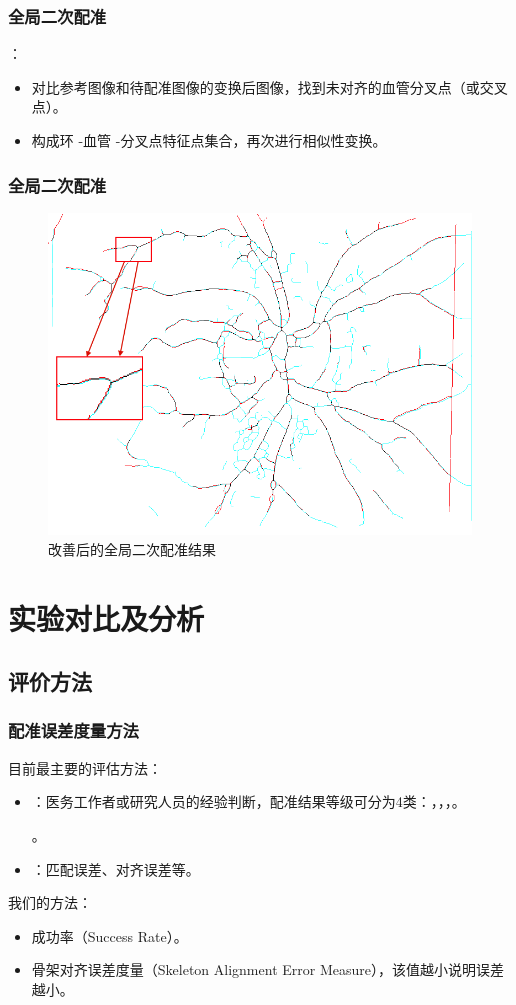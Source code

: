 \documentclass[notheorems,mathserif,table,compress]{beamer}  %
\begin{document}
 \begin{frame}
 \frametitle{全局二次配准}
 {\color{blue}{解决方法}}：
 \begin{itemize}
 \item 对比参考图像和待配准图像的变换后图像，找到未对齐的血管分叉点（或交叉点）。
 \item 构成环 -血管 -分叉点特征点集合，再次进行相似性变换。
 \end{itemize}
\end{frame}

 \begin{frame}
 \frametitle{全局二次配准}
  \begin{figure}[ht!]
    \centering
  \includegraphics[width=0.6\linewidth]{067-119-glocal_reg.png}
  \caption{改善后的全局二次配准结果}
 \end{figure}
\end{frame}

\section{实验对比及分析}
\subsection{评价方法}

\begin{frame}
\frametitle{配准误差度量方法}
目前最主要的评估方法：
\begin{itemize}
\item {\color{blue}{专家主观评估}}：医务工作者或研究人员的经验判断，配准结果等级可分为4类：{\color{blue}{好(Good)}}，{\color{blue}{可接受(Accepted)}}，{\color{blue}{不可接受(Not Accepted)}}，{\color{blue}{差(Bad)}}。

{\color{red}{效率较低，存在较多的主观因素}}。
\item {\color{blue}{客观评估}}：匹配误差、对齐误差等。
\end{itemize}
我们的方法：
\begin{itemize}
\item 成功率（Success Rate）。
\item 骨架对齐误差度量（Skeleton Alignment Error Measure），该值越小说明误差越小。
\end{itemize}
\end{frame}
\end{document}
